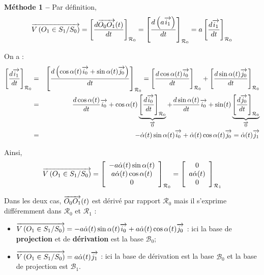 \documentclass[10pt,fleqn]{article} %
\begin{document}
\begin{multicols}{2}
\begin{corrige}
\textbf{Méthode 1 -- }
Par définition, 
$$
\overrightarrow{V\left( {O_1} \in {S_1}/{S_0}\right)} 
= \left[\dfrac{d\overrightarrow{O_0O_1}(t)}{dt}\right]_{\mathcal{R}_0}
= \left[\dfrac{d \left(a \overrightarrow{i_1}\right) }{dt}\right]_{\mathcal{R}_0}
= a \left[\dfrac{d  \overrightarrow{i_1} }{dt}\right]_{\mathcal{R}_0}
$$

On a :
\begin{eqnarray*}
\left[\dfrac{d  \overrightarrow{i_1} }{dt}\right]_{\mathcal{R}_0}
&=&\left[\dfrac{d \left(\cos\alpha(t)\overrightarrow{i_0}+\sin\alpha(t)\overrightarrow{j_0} \right)}{dt}\right]_{\mathcal{R}_0}
=\left[\dfrac{d  \cos\alpha(t)\overrightarrow{i_0}}{dt}\right]_{\mathcal{R}_0}
+\left[\dfrac{d  \sin\alpha(t)\overrightarrow{j_0} }{dt}\right]_{\mathcal{R}_0}\\
& = & 
\dfrac{d \cos\alpha(t)}{dt} \overrightarrow{i_0}  
+\cos\alpha(t)\underbrace{\left[\dfrac{d  \overrightarrow{i_0}}{dt}\right]_{\mathcal{R}_0}}_{\overrightarrow{0}}
+\dfrac{d \sin\alpha(t)}{dt} \overrightarrow{i_0}  
+\sin(t)\underbrace{\left[\dfrac{d  \overrightarrow{j_0}}{dt}\right]_{\mathcal{R}_0}}_{\overrightarrow{0}}\\
& = & -\dot{\alpha}(t)\sin\alpha(t) \overrightarrow{i_0}   + \dot{\alpha}(t)\cos\alpha(t) \overrightarrow{j_0}  = 
\dot{\alpha}(t)\overrightarrow{j_1}
\end{eqnarray*}

Ainsi,
$$
\overrightarrow{V\left( {O_1} \in {S_1}/{S_0}\right)} 
= \left[\begin{array}{c} 
-a\dot{\alpha}(t)\sin\alpha(t) \\
a \dot{\alpha}(t)\cos\alpha(t) \\
0 \end{array}\right]_{\mathcal{R}_0}
=\left[\begin{array}{c} 0 \\ a\dot{\alpha}(t) \\ 0\end{array}\right]_{\mathcal{R}_1}
$$

Dans les deux cas, $\overrightarrow{O_0O_1}(t)$ est dérivé par rapport $\mathcal{R}_0$ mais il s'exprime différemment dans $\mathcal{R}_0$ et $\mathcal{R}_1$ :
\begin{itemize}
\item $\overrightarrow{V\left( {O_1} \in {S_1}/{S_0}\right)} = -a\dot{\alpha}(t)\sin\alpha(t) \overrightarrow{i_0}   + a\dot{\alpha}(t) \cos\alpha(t) \overrightarrow{j_0}$ : ici la base de \textbf{projection} et de \textbf{dérivation} est la base $\mathcal{B}_0$;
\item $\overrightarrow{V\left( {O_1} \in {S_1}/{S_0}\right)} = a\dot{\alpha}(t)\overrightarrow{j_1}$ : ici la base de dérivation est la base $\mathcal{B}_0$ et la base de projection est $\mathcal{B}_1$.
\end{itemize}



\end{corrige}
\end{multicols}
\end{document}
